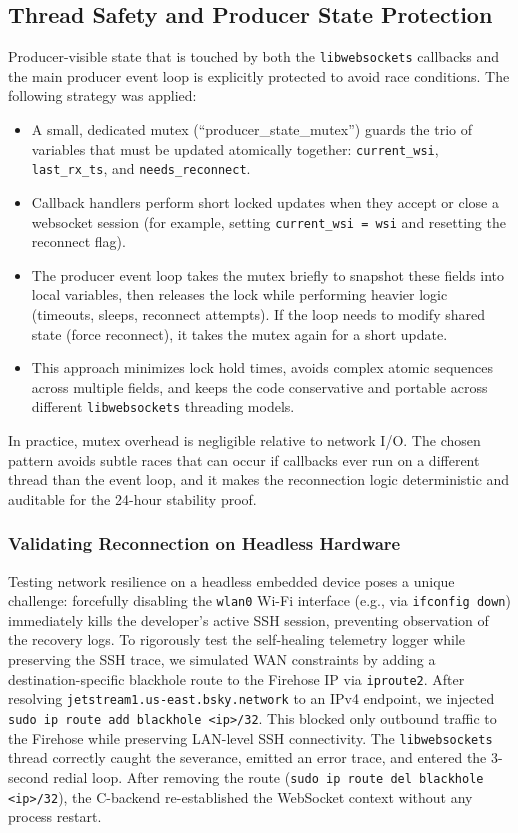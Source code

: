 \documentclass[12pt,a4paper]{article}
\begin{document}
\subsection{Thread Safety and Producer State Protection}
Producer-visible state that is touched by both the \texttt{libwebsockets} callbacks and the main producer event loop is explicitly protected to avoid race conditions. The following strategy was applied:
\begin{itemize}
  \item A small, dedicated mutex (``producer\_state\_mutex'') guards the trio of variables that must be updated atomically together: \texttt{current\_wsi}, \texttt{last\_rx\_ts}, and \texttt{needs\_reconnect}.
  \item Callback handlers perform short locked updates when they accept or close a websocket session (for example, setting \texttt{current\_wsi = wsi} and resetting the reconnect flag).
  \item The producer event loop takes the mutex briefly to snapshot these fields into local variables, then releases the lock while performing heavier logic (timeouts, sleeps, reconnect attempts). If the loop needs to modify shared state (force reconnect), it takes the mutex again for a short update.
  \item This approach minimizes lock hold times, avoids complex atomic sequences across multiple fields, and keeps the code conservative and portable across different \texttt{libwebsockets} threading models.
\end{itemize}

In practice, mutex overhead is negligible relative to network I/O. The chosen pattern avoids subtle races that can occur if callbacks ever run on a different thread than the event loop, and it makes the reconnection logic deterministic and auditable for the 24-hour stability proof.

\subsubsection{Validating Reconnection on Headless Hardware}
Testing network resilience on a headless embedded device poses a unique challenge: forcefully disabling the \texttt{wlan0} Wi-Fi interface (e.g., via \texttt{ifconfig down}) immediately kills the developer's active SSH session, preventing observation of the recovery logs. 
To rigorously test the self-healing telemetry logger while preserving the SSH trace, we simulated WAN constraints by adding a destination-specific blackhole route to the Firehose IP via \texttt{iproute2}. 
After resolving \texttt{jetstream1.us-east.bsky.network} to an IPv4 endpoint, we injected \texttt{sudo ip route add blackhole <ip>/32}. This blocked only outbound traffic to the Firehose while preserving LAN-level SSH connectivity. The \texttt{libwebsockets} thread correctly caught the severance, emitted an error trace, and entered the 3-second redial loop. After removing the route (\texttt{sudo ip route del blackhole <ip>/32}), the C-backend re-established the WebSocket context without any process restart.
\end{document}
